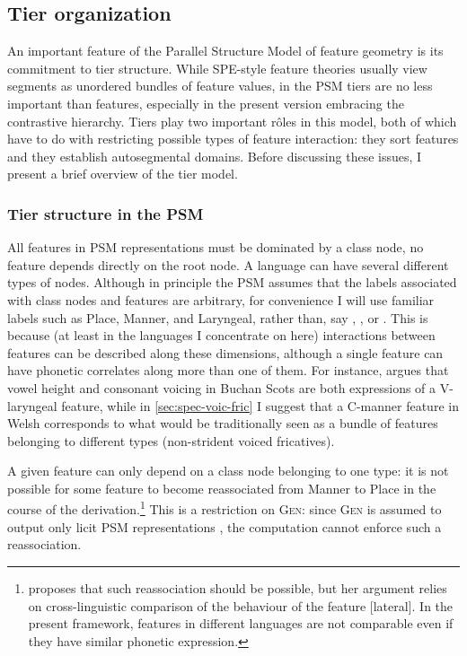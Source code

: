 \subsection{Tier organization}
\label{sec:tier-organization}

An important feature of the Parallel Structure Model of feature geometry is its commitment to tier structure. While SPE-style feature theories usually view segments as unordered bundles of feature values, in the PSM tiers are no less important than features, especially in the present version embracing the contrastive hierarchy. Tiers play two important rôles in this model, both of which have to do with restricting possible types of feature interaction: they sort features and they establish autosegmental domains. Before discussing these issues, I present a brief overview of the tier model.

\subsubsection{Tier structure in the PSM}
\label{sec:tier-structure-psm}

All features in PSM representations must be dominated by a class node, \ie no feature depends directly on the root node. A language can have several different types of nodes. Although in principle the PSM assumes that the labels associated with class nodes and features are arbitrary, for convenience I will use familiar labels such as Place, Manner, and Laryngeal, rather than, say , , or . This is because (at least in the languages I concentrate on here) interactions between features can be described along these dimensions, although a single feature can have phonetic correlates along more than one of them. For instance, \citet{youssef10:_laryn_buchan_scots} argues that vowel height and consonant voicing in Buchan Scots are both expressions of a V-laryngeal feature, while in \cref{sec:spec-voic-fric} I suggest that a C-manner feature in Welsh corresponds to what would be traditionally seen as a bundle of features belonging to different types (non\hyp strident voiced fricatives).

A given feature can only depend on a class node belonging to one type: it is not possible for some feature to become reassociated from Manner to Place in the course of the derivation.\footnote{\citet{yip05:_variab} proposes that such reassociation should be possible, but her argument relies on cross\hyp linguistic comparison of the behaviour of the feature [lateral]. In the present framework, features in different languages are not comparable even if they have similar phonetic expression.} This is a restriction on \textsc{Gen}: since \textsc{Gen} is assumed to output only licit PSM representations \citep{moren-serbian,moren-foa,uffmann07:_restr}, the computation cannot enforce such a reassociation.

